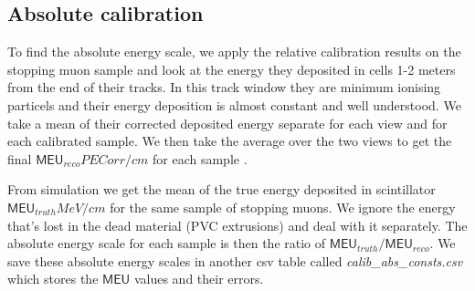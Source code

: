 \documentclass[12pt,a4paper]{article}
\begin{document}


\subsection{Absolute calibration}

To find the absolute energy scale, we apply the relative calibration results on the stopping muon sample and look at the energy they deposited in cells 1-2 meters from the end of their tracks. In this track window they are minimum ionising particels and their energy deposition is almost constant and well understood. We take a mean of their corrected deposited energy separate for each view and for each calibrated sample. We then take the average over the two views to get the final $\textsf{MEU}_{reco} \unit{PECorr/cm}$ for each sample \cite{NOVA-doc-13579-FACalorimetricEnergyScale}.

From simulation we get the mean of the true energy deposited in scintillator $\textsf{MEU}_{truth} \unit{MeV/cm}$ for the same sample of stopping muons. We ignore the energy that's lost in the dead material (PVC extrusions) and deal with it separately. The absolute energy scale for each sample is then the ratio of $\textsf{MEU}_{truth}/\textsf{MEU}_{reco}$. We save these absolute energy scales in another csv table called \textit{calib\_abs\_consts.csv} which stores the $\textsf{MEU}$ values and their errors.
\end{document}
